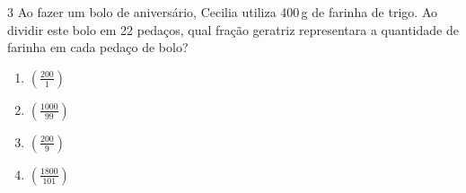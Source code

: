 





\num{3} Ao fazer um bolo de aniversário, Cecilia utiliza 400\,g de farinha de
trigo. Ao dividir este bolo em 22 pedaços, qual fração geratriz
representara a quantidade de farinha em cada pedaço de bolo?

\begin{enumerate}
\def\labelenumi{\alph{enumi})}
\tightlist
\item $(\frac{200}{1})$ 
\item $(\frac{1000}{99})$ 
\item $(\frac{200}{9})$ 
\item $(\frac{1800}{101})$ 
\end{enumerate}














